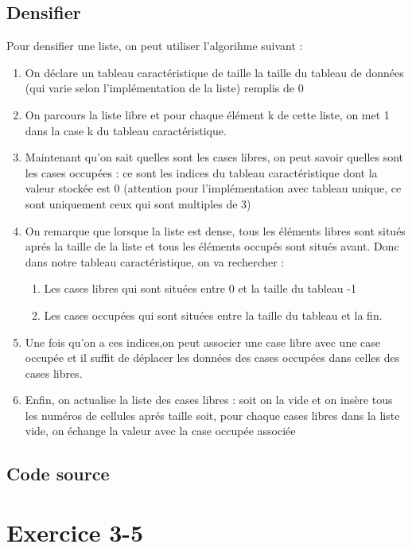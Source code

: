 \documentclass{report}
\begin{document}
    \section{Densifier}
      Pour densifier une liste, on peut utiliser l'algorihme suivant : 
      \begin{enumerate}
        \item On déclare un tableau caractéristique de taille la taille du tableau de données (qui varie selon l'implémentation de la liste) remplis de 0
        \item On parcours la liste libre et pour chaque élément k de cette liste, on met 1 dans la case k du tableau caractéristique.
        \item Maintenant qu'on sait quelles sont les cases libres, on peut savoir quelles sont les cases occupées : ce sont les indices du tableau caractéristique dont la valeur stockée est 0 (attention pour l'implémentation avec tableau unique, ce sont uniquement ceux qui sont multiples de 3)
        \item {On remarque que lorsque la liste est dense, tous les éléments libres sont situés aprés la taille de la liste et tous les éléments occupés sont situés avant. Donc dans notre tableau caractéristique, on va rechercher :
          \begin{enumerate}
          \item Les cases libres qui sont situées entre 0 et la taille du tableau -1
          \item Les cases occupées qui sont situées entre la taille du tableau et la fin.
          \end{enumerate}}
        \item Une fois qu'on a ces indices,on peut associer une case libre avec une case occupée et il suffit de déplacer les données des cases occupées dans celles des cases libres.
        \item Enfin, on actualise la liste des cases libres : soit on la vide et on insère tous les numéros de cellules aprés taille soit, pour chaque cases libres dans la liste vide, on échange la valeur avec la case occupée associée
      \end{enumerate}
    \section{Code source}
      
      
  \chapter{Exercice 3-5}
\end{document}
